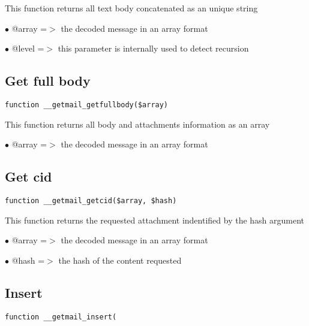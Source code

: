 \documentclass[a4paper]{book}
\begin{document}
This function returns all text body concatenated as an unique string

\begin{compactitem}
\item[\color{myblue}$\bullet$] @array =$>$ the decoded message in an array format
\item[\color{myblue}$\bullet$] @level =$>$ this parameter is internally used to detect recursion
\end{compactitem}

\hypertarget{toc48}{}
\subsection{Get full body}

\begin{lstlisting}
function __getmail_getfullbody($array)
\end{lstlisting}

This function returns all body and attachments information as an array

\begin{compactitem}
\item[\color{myblue}$\bullet$] @array =$>$ the decoded message in an array format
\end{compactitem}

\hypertarget{toc49}{}
\subsection{Get cid}

\begin{lstlisting}
function __getmail_getcid($array, $hash)
\end{lstlisting}

This function returns the requested attachment indentified by the hash argument

\begin{compactitem}
\item[\color{myblue}$\bullet$] @array =$>$ the decoded message in an array format
\item[\color{myblue}$\bullet$] @hash  =$>$ the hash of the content requested
\end{compactitem}

\hypertarget{toc50}{}
\subsection{Insert}

\begin{lstlisting}
function __getmail_insert(
\end{lstlisting}
\end{document}
